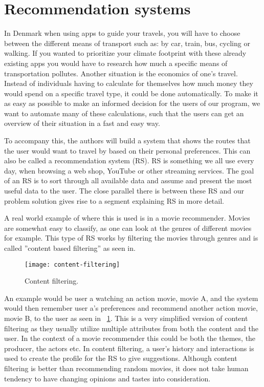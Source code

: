 \section{Recommendation systems}\label{sec:recommendation-systems}

In Denmark when using apps to guide your travels, you will have to choose between the different means of transport such
as: by car, train, bus, cycling or walking.
If you wanted to prioritize your climate footprint with these already existing apps you would have to research how much
a specific means of transportation pollutes.
Another situation is the economics of one's travel.
Instead of individuals having to calculate for themselves how much money they would spend on a specific travel type,
it could be done automatically.
To make it as easy as possible to make an informed decision for the users of our program, we want to automate many of
these calculations, such that the users can get an overview of their situation in a fast and easy way.

To accompany this, the authors will build a system that shows the routes that the user would want to travel by based on
their personal preferences.
This can also be called a recommendation system (RS).
RS is something we all use every day, when browsing a web shop, YouTube or other streaming services.
The goal of an RS is to sort through all available data and assume and present the most useful data to the user.
The close parallel there is between these RS and our problem solution gives rise to a segment explaining RS in more
detail.

A real world example of where this is used is in a movie recommender.
Movies are somewhat easy to classify, as one can look at the genres of different movies for example.
This type of RS works by filtering the movies through genres and is called ''content based filtering'' as seen in.

\begin{figure}
    \centering
    \texttt{[image: content-filtering]}
    \caption{Content filtering. \cite{content_based_filtering}}
    \label{fig:figure3}
\end{figure}

An example would be user a watching an action movie, movie A, and the system would then remember user a's preferences
and recommend another action movie, movie B, to the user as seen in ~\ref{fig:figure3}.
This is a very simplified version of content filtering as they usually utilize multiple attributes from both the content
and the user.
In the context of a movie recommender this could be both the themes, the producer, the actors etc.
In content filtering, a user's history and interactions is used to create the profile for the RS to give suggestions.
Although content filtering is better than recommending random movies, it does not take human tendency to have changing
opinions and tastes into consideration.

